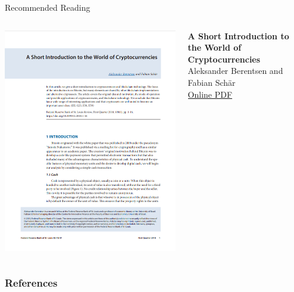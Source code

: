 \documentclass[]{beamer}
\begin{document}
\begin{frame}{Recommended Reading}
\begin{columns}
	\begin{column}{0.3\textwidth}
	\center
	\includegraphics[width=\textwidth , frame]{../assets/images/short-introduction-cryptocurrencies.png}
	\end{column}
	\begin{column}{0.7\textwidth}
	\textbf{A Short Introduction to the World of Cryptocurrencies} \\
	Aleksander Berentsen and Fabian Schär \\
	\link \href{https://files.stlouisfed.org/files/htdocs/publications/review/2018/01/10/a-short-introduction-to-the-world-of-cryptocurrencies.pdf}{Online PDF}
	\end{column}
\end{columns}
\end{frame}

\begin{frame}%
\frametitle{References}
	
	
\end{frame}
\end{document}
